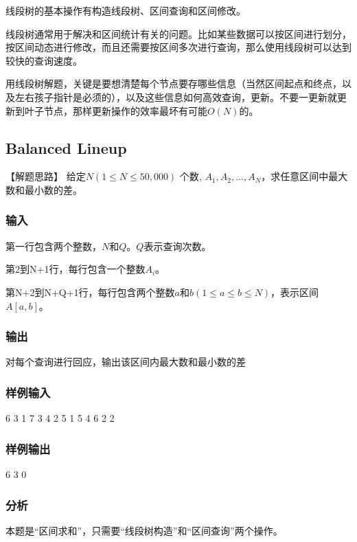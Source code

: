 线段树的基本操作有构造线段树、区间查询和区间修改。

线段树通常用于解决和区间统计有关的问题。比如某些数据可以按区间进行划分，按区间动态进行修改，而且还需要按区间多次进行查询，那么使用线段树可以达到较快的查询速度。

用线段树解题，关键是要想清楚每个节点要存哪些信息（当然区间起点和终点，以及左右孩子指针是必须的），以及这些信息如何高效查询，更新。不要一更新就更新到叶子节点，那样更新操作的效率最坏有可能$O(N)$的。

\subsection{Balanced Lineup} %
【解题思路】
给定$N(1 \leq N \leq 50,000)$ 个数, $A_1, A_2, ... , A_N$，求任意区间中最大数和最小数的差。

\subsubsection{输入}
第一行包含两个整数，$N$和$Q$。$Q$表示查询次数。

第2到N+1行，每行包含一个整数$A_i$。

第N+2到N+Q+1行，每行包含两个整数$a$和$b(1 \leq a \leq b \leq N)$，表示区间$A[a,b]$。

\subsubsection{输出}
对每个查询进行回应，输出该区间内最大数和最小数的差

\subsubsection{样例输入}
\begin{Code}
6 3
1
7
3
4
2
5
1 5
4 6
2 2
\end{Code}

\subsubsection{样例输出}
\begin{Code}
6
3
0
\end{Code}

\subsubsection{分析}
本题是“区间求和”，只需要“线段树构造”和“区间查询”两个操作。

